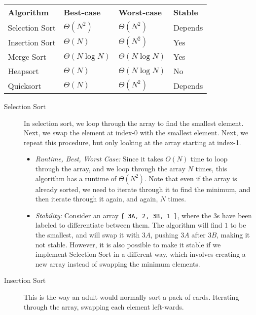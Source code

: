 \begin{solution}
{
\renewcommand{\arraystretch}{2}
\setlength{\tabcolsep}{12pt}
\begin{tabularx}{\textwidth}{Xlll}
Algorithm         & Best-case          & Worst-case          & Stable \\\hline
Selection Sort    & $\Theta(N^2)$      & $\Theta(N^2)$       & Depends\\
Insertion Sort    & $\Theta(N)$        & $\Theta(N^2)$       & Yes    \\
Merge Sort        & $\Theta(N \log N)$ & $\Theta(N \log N)$  & Yes    \\
Heapsort          & $\Theta(N)$        & $\Theta(N \log N)$  & No	  \\
Quicksort         & $\Theta(N)$        & $\Theta(N^2)$       & Depends
\end{tabularx}
}

\begin{description}
\item[Selection Sort]
In selection sort, we loop through the array to find the smallest element.
Next, we swap the element at index-0 with the smallest element. Next, we repeat
this procedure, but only looking at the array starting at index-1.

\begin{itemize}
\item \textit{Runtime, Best, Worst Case:} Since it takes $O(N)$ time to loop
through the array, and we loop through the array $N$ times, this algorithm has
a runtime of $\Theta(N^2)$. Note that even if the array is already sorted, we
need to iterate through it to find the minimum, and then iterate through it
again, and again, $N$ times.
\item \textit{Stability:} Consider an array \lstinline${ 3A, 2, 3B, 1 }$, where
the $3$s have been labeled to differentiate between them. The algorithm will
find $1$ to be the smallest, and will swap it with $3A$, pushing $3A$ after
$3B$, making it not stable. However, it is also possible to make it stable if
we implement Selection Sort in a different way, which involves creating a new
array instead of swapping the minimum elements.
\end{itemize}

\item[Insertion Sort]
This is the way an adult would normally sort a pack of cards. Iterating through
the array, swapping each element left-wards.


\end{description}
\end{solution}
